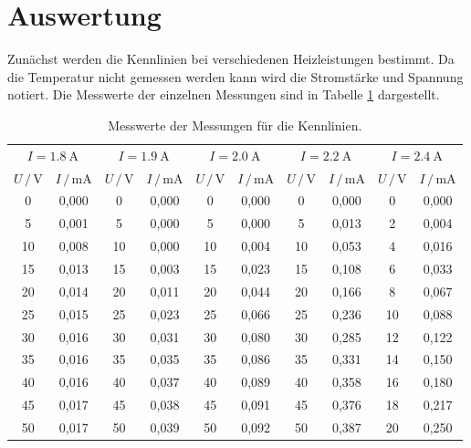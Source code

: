 \section{Auswertung}

Zunächst werden die Kennlinien bei verschiedenen Heizleistungen bestimmt. Da
die Temperatur nicht gemessen werden kann wird die Stromstärke und Spannung notiert. Die
Messwerte der einzelnen Messungen sind in Tabelle \ref{tab:1} dargestellt.

\begin{table}[H]
  \centering
  \caption{Messwerte der Messungen für die Kennlinien.}
  \label{tab:1}
  \begin{tabular}{c c c c c c c c c c}
\toprule
\multicolumn{2}{c}{$I=\SI{1.8}{\ampere}$} & \multicolumn{2}{c}{$I=\SI{1.9}{\ampere}$} & \multicolumn{2}{c}{$I=\SI{2.0}{\ampere}$} & \multicolumn{2}{c}{$I=\SI{2.2}{\ampere}$} & \multicolumn{2}{c}{$I=\SI{2.4}{\ampere}$}\\
\cmidrule(lr){1-2}\cmidrule(lr){3-4}\cmidrule(lr){5-6}\cmidrule(lr){7-8}\cmidrule(lr){9-10}
$U \, / \, \si{\volt}$ & $I \, / \, \si{\milli\ampere}$ & $U \, / \, \si{\volt}$ & $I \, / \, \si{\milli\ampere}$ &$U \, / \, \si{\volt}$ & $I \, / \, \si{\milli\ampere}$ & $U \, / \, \si{\volt}$ & $I \, / \, \si{\milli\ampere}$ & $U \, / \, \si{\volt}$ & $I \, / \, \si{\milli\ampere}$ \\
\midrule
0   & 0,000 & 0   & 0,000 & 0   & 0,000 & 0   & 0,000 & 0   & 0,000 \\
5   & 0,001 & 5   & 0,000 & 5   & 0,000 & 5   & 0,013 & 2   & 0,004 \\
10  & 0,008 & 10  & 0,000 & 10  & 0,004 & 10  & 0,053 & 4   & 0,016 \\
15  & 0,013 & 15  & 0,003 & 15  & 0,023 & 15  & 0,108 & 6   & 0,033 \\
20  & 0,014 & 20  & 0,011 & 20  & 0,044 & 20  & 0,166 & 8   & 0,067 \\
25  & 0,015 & 25  & 0,023 & 25  & 0,066 & 25  & 0,236 & 10  & 0,088 \\
30  & 0,016 & 30  & 0,031 & 30  & 0,080 & 30  & 0,285 & 12  & 0,122 \\
35  & 0,016 & 35  & 0,035 & 35  & 0,086 & 35  & 0,331 & 14  & 0,150 \\
40  & 0,016 & 40  & 0,037 & 40  & 0,089 & 40  & 0,358 & 16  & 0,180 \\
45  & 0,017 & 45  & 0,038 & 45  & 0,091 & 45  & 0,376 & 18  & 0,217 \\
50  & 0,017 & 50  & 0,039 & 50  & 0,092 & 50  & 0,387 & 20  & 0,250 \\

\end{tabular}
\end{table}
